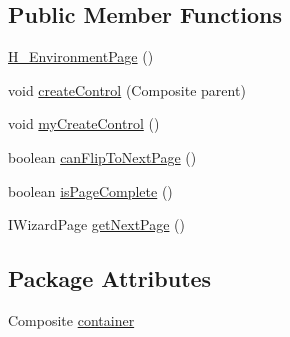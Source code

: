 \subsection*{Public Member Functions}
\begin{DoxyCompactItemize}
\item 
\hyperlink{classit_1_1isislab_1_1masonassisteddocumentation_1_1mason_1_1wizards_1_1_h___environment_page_ac5fad5d59d7624457e9a112bd26cace4}{H\-\_\-\-Environment\-Page} ()
\item 
void \hyperlink{classit_1_1isislab_1_1masonassisteddocumentation_1_1mason_1_1wizards_1_1_h___environment_page_a5ef5851189f2426f65a9be54f9bb2ae6}{create\-Control} (Composite parent)
\item 
void \hyperlink{classit_1_1isislab_1_1masonassisteddocumentation_1_1mason_1_1wizards_1_1_h___environment_page_a99746d862f89a4dad13af734914642cf}{my\-Create\-Control} ()
\item 
boolean \hyperlink{classit_1_1isislab_1_1masonassisteddocumentation_1_1mason_1_1wizards_1_1_h___environment_page_aa070c8db66ce1e1168d3109240643909}{can\-Flip\-To\-Next\-Page} ()
\item 
boolean \hyperlink{classit_1_1isislab_1_1masonassisteddocumentation_1_1mason_1_1wizards_1_1_h___environment_page_aa3dfe57e15ad1780fd206a6f6082d7de}{is\-Page\-Complete} ()
\item 
I\-Wizard\-Page \hyperlink{classit_1_1isislab_1_1masonassisteddocumentation_1_1mason_1_1wizards_1_1_h___environment_page_a433c08ab6e8cde7ef9e24e1946e714a3}{get\-Next\-Page} ()
\end{DoxyCompactItemize}
\subsection*{Package Attributes}
\begin{DoxyCompactItemize}
\item 
Composite \hyperlink{classit_1_1isislab_1_1masonassisteddocumentation_1_1mason_1_1wizards_1_1_h___environment_page_a77ebe828c5c45ce8b60db94f30d94203}{container}
\end{DoxyCompactItemize}
